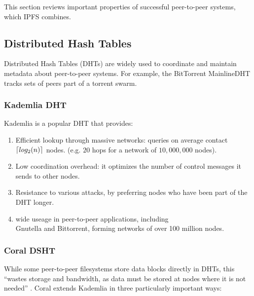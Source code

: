 \documentclass{sig-alternate}
\DeclarePairedDelimiter{\ceil}{\lceil}{\rceil}
\begin{document}
This section reviews important properties of successful peer-to-peer systems, which IPFS combines.

\subsection{Distributed Hash Tables}

Distributed Hash Tables (DHTs) are widely used to coordinate and maintain metadata about peer-to-peer systems. For example, the BitTorrent MainlineDHT tracks sets of peers part of a torrent swarm.

\subsubsection{Kademlia DHT}

Kademlia \cite{Kademlia} is a popular DHT that provides:

\begin{enumerate}

  \item Efficient lookup through massive networks:
        queries on average contact $ \ceil{log_2 (n)} $ nodes.
        (e.g. $20$ hops for a network of $10,000,000$ nodes).

  \item Low coordination overhead: it optimizes the number of
        control messages it sends to other nodes.

  \item Resistance to various attacks, by preferring nodes who have been
        part of the DHT longer.

  \item wide useage in peer-to-peer applications, including \\
        Gnutella and Bittorrent, forming networks of over 100 million nodes.

 \end{enumerate}


\subsubsection{Coral DSHT}

While some peer-to-peer filesystems store data blocks directly in DHTs,
this ``wastes storage and bandwidth, as data must be stored at nodes where it
is not needed'' \cite{Coral}. Coral extends Kademlia in three particularly important ways:
\end{document}
